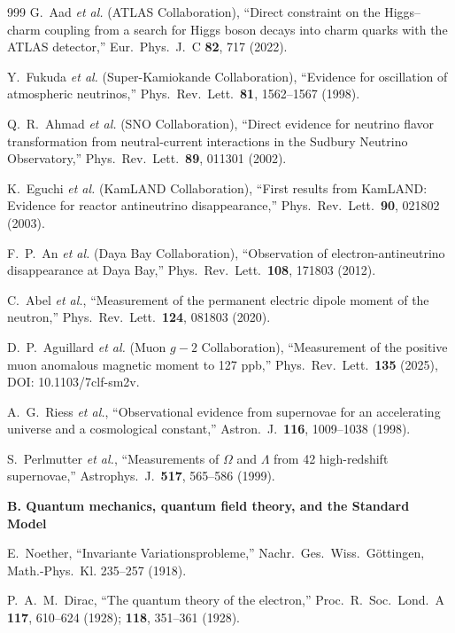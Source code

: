 \begin{thebibliography}{999}
G.~Aad \emph{et al.} (ATLAS Collaboration),
``Direct constraint on the Higgs--charm coupling from a search for Higgs boson
decays into charm quarks with the ATLAS detector,''
Eur.\ Phys.\ J.\ C \textbf{82}, 717 (2022).

Y.~Fukuda \emph{et al.} (Super-Kamiokande Collaboration),
``Evidence for oscillation of atmospheric neutrinos,''
Phys.\ Rev.\ Lett.\ \textbf{81}, 1562--1567 (1998).

Q.~R.~Ahmad \emph{et al.} (SNO Collaboration),
``Direct evidence for neutrino flavor transformation from neutral-current
interactions in the Sudbury Neutrino Observatory,''
Phys.\ Rev.\ Lett.\ \textbf{89}, 011301 (2002).

K.~Eguchi \emph{et al.} (KamLAND Collaboration),
``First results from KamLAND: Evidence for reactor antineutrino disappearance,''
Phys.\ Rev.\ Lett.\ \textbf{90}, 021802 (2003).

F.~P.~An \emph{et al.} (Daya Bay Collaboration),
``Observation of electron-antineutrino disappearance at Daya Bay,''
Phys.\ Rev.\ Lett.\ \textbf{108}, 171803 (2012).

C.~Abel \emph{et al.},
``Measurement of the permanent electric dipole moment of the neutron,''
Phys.\ Rev.\ Lett.\ \textbf{124}, 081803 (2020).

D.~P.~Aguillard \emph{et al.} (Muon $g-2$ Collaboration),
``Measurement of the positive muon anomalous magnetic moment to 127 ppb,''
Phys.\ Rev.\ Lett.\ \textbf{135} (2025), DOI: 10.1103/7clf-sm2v.

A.~G.~Riess \emph{et al.},
``Observational evidence from supernovae for an accelerating universe and a
cosmological constant,'' Astron.\ J.\ \textbf{116}, 1009--1038 (1998).

S.~Perlmutter \emph{et al.},
``Measurements of $\Omega$ and $\Lambda$ from 42 high-redshift supernovae,''
Astrophys.\ J.\ \textbf{517}, 565--586 (1999).

\item[]\textbf{B. Quantum mechanics, quantum field theory, and the Standard Model}

E.~Noether,
``Invariante Variationsprobleme,''
Nachr.\ Ges.\ Wiss.\ G\"ottingen, Math.-Phys.\ Kl. 235--257 (1918).

P.~A.~M.~Dirac,
``The quantum theory of the electron,''
Proc.\ R.\ Soc.\ Lond.\ A \textbf{117}, 610--624 (1928); \textbf{118},
351--361 (1928).


\end{thebibliography}
